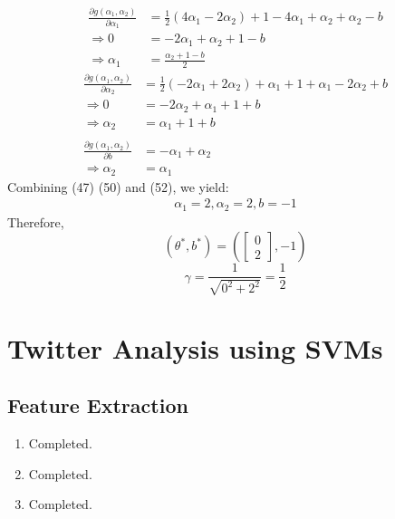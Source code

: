 \documentclass[11pt]{article}
\newcommand{\solution}[1]{{{\color{blue}{\bf Solution:} {#1}}}}
\begin{document}
\begin{enumerate}
{\begin{align}
\frac{\partial g(\alpha_1, \alpha_2)}{\partial \alpha_1} &= \frac{1}{2}(4\alpha_1-2\alpha_2)+1-4\alpha_1+\alpha_2+\alpha_2 - b \\
\Rightarrow 0 &= -2\alpha_1 + \alpha_2 + 1 - b \\
\Rightarrow \alpha_1 &= \frac{\alpha_2+1-b}{2}
\end{align}
\begin{align}
\frac{\partial g(\alpha_1, \alpha_2)}{\partial \alpha_2} &= \frac{1}{2}(-2\alpha_1+2\alpha_2)+\alpha_1+1+\alpha_1-2\alpha_2 + b\\
\Rightarrow 0 &= -2\alpha_2+\alpha_1+1+b \\
\Rightarrow \alpha_2 &= \alpha_1 + 1 + b \\
\nonumber \\
\frac{\partial g(\alpha_1, \alpha_2)}{\partial b} &= -\alpha_1 + \alpha_2 \\
\Rightarrow \alpha_2 &= \alpha_1
\end{align}
Combining (47) (50) and (52), we yield:
\begin{align}
\alpha_1 = 2, \alpha_2 = 2, b = -1
\end{align}
Therefore,
\begin{equation}
(\theta^*, b^*) = (\begin{bmatrix} 0 \\ 2 \end{bmatrix}, - 1)
\end{equation}
\begin{equation}
\gamma = \frac{1}{\sqrt{0^2 + 2^2}} = \frac{1}{2}
\end{equation}
}
\newpage
\end{enumerate}

\section{Twitter Analysis using SVMs}
\subsection{Feature Extraction}
\begin{enumerate}
\item
\solution{
Completed.
}
\item
\solution{
Completed.
}
\item
\solution{
Completed.
}
\end{enumerate}
\end{document}
